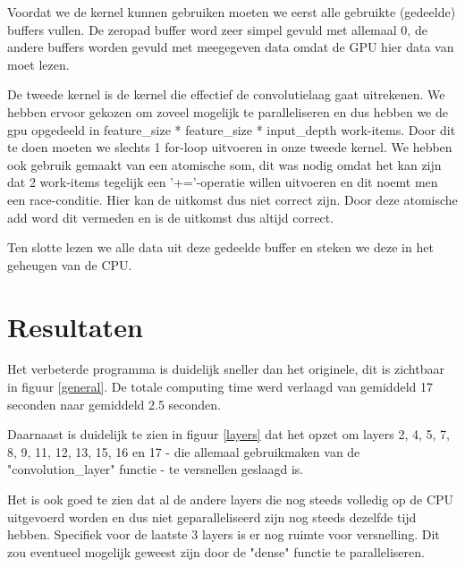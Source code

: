 \documentclass[a4paper, 12pt, one column]{article}
\begin{document}
\medskip
\noindent
Voordat we de kernel kunnen gebruiken moeten we eerst alle gebruikte (gedeelde) buffers vullen. De zeropad buffer 
word zeer simpel gevuld met allemaal 0, de andere buffers worden gevuld met meegegeven data omdat de GPU hier data
van moet lezen.

\medskip
\noindent
De tweede kernel is de kernel die effectief de convolutielaag gaat uitrekenen. We hebben ervoor gekozen om zoveel mogelijk te 
paralleliseren en dus hebben we de gpu opgedeeld in feature\_size * feature\_size * input\_depth work-items.
Door dit te doen moeten we slechts 1 for-loop uitvoeren in onze tweede kernel. 
We hebben ook gebruik gemaakt van een atomische som, dit was nodig omdat het kan zijn dat 2 work-items tegelijk een '+='-operatie
willen uitvoeren en dit noemt men een race-conditie. Hier kan de uitkomst dus niet correct zijn. Door deze atomische add word dit 
vermeden en is de uitkomst dus altijd correct.

\medskip
\noindent
Ten slotte lezen we alle data uit deze gedeelde buffer en steken we deze in het geheugen van de CPU.

\section{Resultaten}
Het verbeterde programma is duidelijk sneller dan het originele, dit is zichtbaar in figuur \ref{general}. De totale computing time
werd verlaagd van gemiddeld 17 seconden naar gemiddeld 2.5 seconden.

\medskip
\noindent
Daarnaast is duidelijk te zien in figuur \ref{layers} dat het opzet om layers 2, 4, 5, 7, 8, 9, 11, 12, 13, 15, 16 en 17 - die allemaal
gebruikmaken van de "convolution\_layer" functie - te versnellen geslaagd is.

\medskip
\noindent
Het is ook goed te zien dat al de andere layers die nog steeds volledig op de CPU uitgevoerd worden en dus niet geparalleliseerd zijn
nog steeds dezelfde tijd hebben. Specifiek voor de laatste 3 layers is er nog ruimte voor versnelling. Dit zou eventueel mogelijk geweest
zijn door de "dense" functie te paralleliseren.
\end{document}
